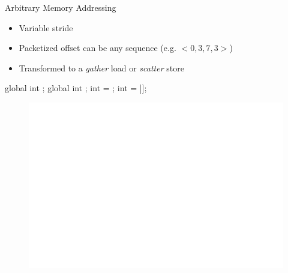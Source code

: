 \begin{frame}[fragile]{Arbitrary Memory Addressing}

\begin{itemize}
    \item Variable stride
    \item Packetized offset can be any sequence (e.g. $<0, 3, 7, 3>$)
    \item Transformed to a \emph{gather} load or \emph{scatter} store
\end{itemize}

\begin{minipage}[t]{0.40\linewidth}
    \vspace{0.1ex}
    \begin{codebox}[commandchars=\\\[\]]
    
global int \uniform[*src];
global int \uniform[*map];
int \varying[tid] = ;
int \varying[x] = \uniform[src]\idx[\uniform[map]\idx[\varying[tid]]];




    \end{codebox}
\end{minipage}
\hspace{1em}
\begin{minipage}[t]{0.49\linewidth}
    \begin{figure}
        \includegraphics[scale=0.5]{images/arbitrary-access.pdf}
    \end{figure}
\end{minipage}

\end{frame}



